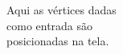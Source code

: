 \documentclass[preview]{standalone}
\begin{document}
Aqui as vértices dadas\\como entrada são\\posicionadas na tela.\\
\end{document}
